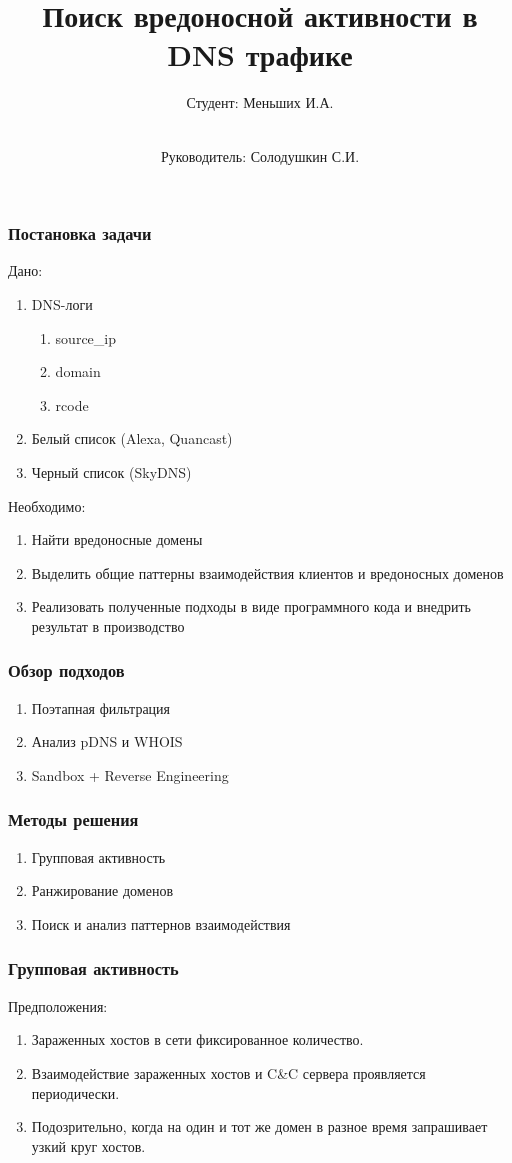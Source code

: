 \documentclass[10pt,pdf,hyperref={unicode}]{beamer}
\title{Поиск вредоносной активности в DNS трафике}
\author{
	Студент: Меньших И.А.
	\and \\
	Руководитель: Солодушкин С.И.
}
\date{}
\begin{document}
\begin{frame}
\titlepage
\end{frame} 

\begin{frame}
\frametitle{Постановка задачи} 
Дано:
\begin{enumerate}
	\item DNS-логи
	\begin{enumerate}[-]
		\item source\_ip
		\item domain
		\item rcode
	
	\end{enumerate}
	\item Белый список (Alexa, Quancast)
	\item Черный список (SkyDNS)
\end{enumerate}

Необходимо:
\begin{enumerate}
	\item Найти вредоносные домены
	\item Выделить общие паттерны взаимодействия клиентов и вредоносных доменов
	\item Реализовать полученные подходы в виде программного кода и внедрить результат в производство
\end{enumerate}
\end{frame}

\begin{frame}
\frametitle{Обзор подходов} 
\begin{enumerate}
	\item Поэтапная фильтрация
	\item Анализ pDNS и WHOIS
	\item Sandbox + Reverse Engineering
\end{enumerate}
\end{frame}

\begin{frame}
\frametitle{Методы решения} 
\begin{enumerate}
	\item Групповая активность
	\item Ранжирование доменов
	\item Поиск и анализ паттернов взаимодействия
\end{enumerate}
\end{frame}

\begin{frame}
\frametitle{Групповая активность}
Предположения:
\begin{enumerate}
	\item Зараженных хостов в сети фиксированное количество.
	\item Взаимодействие зараженных хостов и C\&C сервера проявляется периодически.
	\item  Подозрительно, когда на один и тот же домен в разное время запрашивает узкий круг хостов.
\end{enumerate}
\end{frame}
\end{document}
